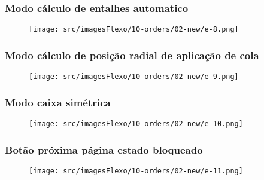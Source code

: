 \newpage
\thispagestyle{fancy}
\vspace*{40 pt}
\subsubsection{\small{Modo cálculo de entalhes automatico}}\label{telaNovoPedidoPagina2ModoCalculoDeEntalhesAutomatico}
\vspace*{\fill}
\begin{figure}[h]
  \centering
  \texttt{[image: src/imagesFlexo/10-orders/02-new/e-8.png]}
\end{figure}
\vspace*{\fill}

\newpage
\thispagestyle{fancy}
\vspace*{40 pt}
\subsubsection{\small{Modo cálculo de posição	radial de aplicação de cola}}\label{telaNovoPedidoPagina2ModoCalculoDePosicaoRadialDeAplicacaoDeCola}
\vspace*{\fill}
\begin{figure}[h]
  \centering
  \texttt{[image: src/imagesFlexo/10-orders/02-new/e-9.png]}
\end{figure}
\vspace*{\fill}

\newpage
\thispagestyle{fancy}
\vspace*{40 pt}
\subsubsection{\small{Modo caixa simétrica}}\label{telaNovoPedidoPagina2ModoCaixaSimetrica}
\vspace*{\fill}
\begin{figure}[h]
  \centering
  \texttt{[image: src/imagesFlexo/10-orders/02-new/e-10.png]}
\end{figure}
\vspace*{\fill}

\newpage
\thispagestyle{fancy}
\vspace*{40 pt}
\subsubsection{\small{Botão próxima página estado bloqueado}}\label{telaNovoPedidoPagina2BotaoProximaPaginaEstadoBloqueado}
\vspace*{\fill}
\begin{figure}[h]
  \centering
  \texttt{[image: src/imagesFlexo/10-orders/02-new/e-11.png]}
\end{figure}
\vspace*{\fill}